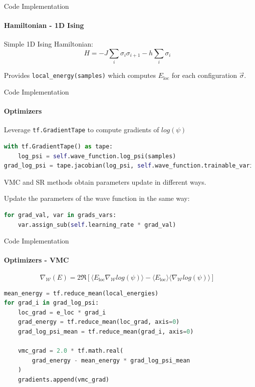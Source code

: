 \documentclass{beamer}
\begin{document}
\begin{frame}[fragile]{Code Implementation}
\framesubtitle{Hamiltonian - 1D Ising}

Simple 1D Ising Hamiltonian:
$$ H = -J \sum_{i} \sigma_{i} \sigma_{i+1} - h \sum_{i} \sigma_{i} $$

Provides \lstinline[style=kaolstplain]|local_energy(samples)| which computes $E_{\text{loc}}$ for each configuration $\vec{\sigma}$.

\end{frame}

\begin{frame}[fragile]{Code Implementation}
\framesubtitle{Optimizers}
Leverage \lstinline[style=kaolstplain]|tf.GradientTape| to compute gradients of $log\left(\psi\right)$
\begin{lstlisting}[language=Python, style=kaolstplain]
with tf.GradientTape() as tape:
	log_psi = self.wave_function.log_psi(samples)
grad_log_psi = tape.jacobian(log_psi, self.wave_function.trainable_variables)
\end{lstlisting}
\baselineskip

VMC and SR methods obtain parameters update in different ways.
\baselineskip

Update the parameters of the wave function in the same way:
\begin{lstlisting}[language=Python, style=kaolstplain]
for grad_val, var in grads_vars:
	var.assign_sub(self.learning_rate * grad_val)
\end{lstlisting}
\end{frame}

\begin{frame}[fragile]{Code Implementation}
\framesubtitle{Optimizers - VMC}
$$
\nabla_{\mathcal{W}} \left(E\right)
    = 2 \mathfrak{R} \left[ \langle E_{\text{loc}} \nabla_{\mathcal{W}} log(\psi) \rangle - \langle E_{\text{loc}} \rangle \langle \nabla_{\mathcal{W}} log(\psi) \rangle \right]
$$

\begin{lstlisting}[language=Python, style=kaolstplain]
mean_energy = tf.reduce_mean(local_energies)
for grad_i in grad_log_psi:
	loc_grad = e_loc * grad_i
	grad_energy = tf.reduce_mean(loc_grad, axis=0)
	grad_log_psi_mean = tf.reduce_mean(grad_i, axis=0)

	vmc_grad = 2.0 * tf.math.real(
		grad_energy - mean_energy * grad_log_psi_mean
	)
	gradients.append(vmc_grad)
\end{lstlisting}

\end{frame}
\end{document}
